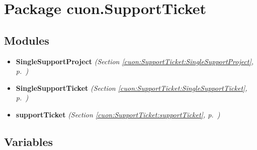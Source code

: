 %
%
%


\section{Package cuon.SupportTicket}

    \label{cuon:SupportTicket}


\subsection{Modules}

\begin{itemize}
\setlength{\parskip}{0ex}
\item \textbf{SingleSupportProject}
  \textit{(Section \ref{cuon:SupportTicket:SingleSupportProject}, p.~\pageref{cuon:SupportTicket:SingleSupportProject})}

\item \textbf{SingleSupportTicket}
  \textit{(Section \ref{cuon:SupportTicket:SingleSupportTicket}, p.~\pageref{cuon:SupportTicket:SingleSupportTicket})}

\item \textbf{supportTicket}
  \textit{(Section \ref{cuon:SupportTicket:supportTicket}, p.~\pageref{cuon:SupportTicket:supportTicket})}

\end{itemize}



  \subsection{Variables}

